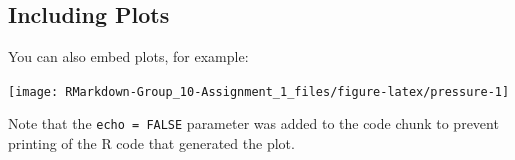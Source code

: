 \hypertarget{including-plots}{%
\subsection{Including Plots}\label{including-plots}}

You can also embed plots, for example:

\begin{Schunk}

\texttt{[image: RMarkdown-Group\_10-Assignment\_1\_files/figure-latex/pressure-1]} \end{Schunk}

Note that the \texttt{echo\ =\ FALSE} parameter was added to the code
chunk to prevent printing of the R code that generated the plot.


\address{%
Alex Fung\\
\\
\\
}


\address{%
Viswesh Krishnamurthy\\
\\
\\
}


\address{%
Tony Lee\\
\\
\\
}


\address{%
Patrick Osborne\\
\\
\\
}


